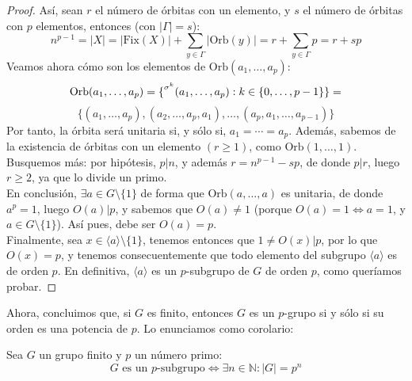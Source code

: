 \documentclass[12pt]{article}
\newcommand{\N}{\mathbb{N}}
\newcommand{\Fix}{\text{Fix}}
\newcommand{\Orb}{\text{Orb}}
\begin{document}
\begin{ejercicio}[2 puntos]
\begin{proof}
            Así, sean $r$ el número de órbitas con un elemento, y $s$ el número de órbitas con $p$ elementos, entonces (con $|\Gamma| = s$):
            $$n^{p-1} = |X| = |\Fix(X)| + \sum_{y \in \Gamma} |\Orb(y)| = r + \sum_{y \in \Gamma} p = r + sp$$
            Veamos ahora cómo son los elementos de $\Orb(a_1, \ldots, a_p)$:
            $$\Orb(a_1, \ldots, a_p) = \{\prescript{\sigma^{k}}{}{(a_1, \ldots, a_p)} : k \in \{0, \ldots, p-1\}\} = $$ 
            $$\{(a_1, \ldots, a_p), (a_2, \ldots, a_p, a_1), \ldots, (a_p, a_1, \ldots, a_{p-1})\}$$
            Por tanto, la órbita será unitaria si, y sólo si, $a_1 = \cdots = a_p$. Además, sabemos de la existencia de órbitas con un elemento $(r \geqslant 1)$, como $\Orb(1, \ldots, 1)$. Busquemos más: por hipótesis, $p | n$, y además $r = n^{p-1} - sp$, de donde $p | r$, luego $r \geqslant 2$, ya que lo divide un primo. \\

            En conclusión, $\exists a \in G \setminus \{1\}$ de forma que $\Orb(a, \ldots, a)$ es unitaria, de donde $a^{p} = 1$, luego $O(a) | p$, y sabemos que $O(a) \neq 1$ (porque $O(a) = 1 \iff a = 1$, y $a \in G \setminus \{1\}$). Así pues, debe ser $O(a) = p$. \\

            Finalmente, sea $x \in \langle a \rangle \setminus \{1\}$, tenemos entonces que $1 \neq O(x) | p$, por lo que $O(x) = p$, y tenemos consecuentemente que todo elemento del subgrupo $\langle a \rangle$ es de orden $p$. En definitiva, $\langle a \rangle$ es un $p$-subgrupo de $G$ de orden $p$, como queríamos probar.
        \end{proof}

        Ahora, concluimos que, si $G$ es finito, entonces $G$ es un $p$-grupo si y sólo si su orden es una potencia de $p$. Lo enunciamos como corolario:

        \begin{coro}
            Sea $G$ un grupo finito y $p$ un número primo:
            $$G \text{ es un $p$-subgrupo} \iff \exists n \in \N : |G| = p^{n}$$
        \end{coro}


\end{ejercicio}
\end{document}
